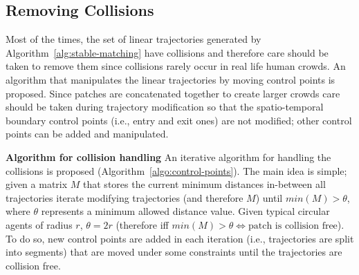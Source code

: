 \subsection{Removing Collisions}
\label{sec:method:remove-collisions}

Most of the times, the set of linear trajectories generated by Algorithm~\ref{alg:stable-matching} have collisions and therefore care should be taken to remove them since collisions rarely occur in real life human crowds.
An algorithm that manipulates the linear trajectories by moving control points is proposed.
Since patches are concatenated together to create larger crowds care should be taken during trajectory modification so that the spatio-temporal boundary control points (i.e., entry and exit ones) are not modified; other control points can be added and manipulated.


\textbf{Algorithm for collision handling} An iterative algorithm for handling the collisions is proposed (Algorithm~\ref{algo:control-points}).
The main idea is simple; given a matrix $M$ that stores the current minimum distances in-between all trajectories iterate modifying trajectories (and therefore $M$) until $min(M) > \theta$, where $\theta$ represents a minimum allowed distance value.
Given typical circular agents of radius $r$, $\theta = 2r$ (therefore iff $min(M) > \theta \Leftrightarrow \text{patch is collision free}$).
To do so, new control points are added in each iteration (i.e., trajectories are split into segments) that are moved under some constraints until the trajectories are collision free.

